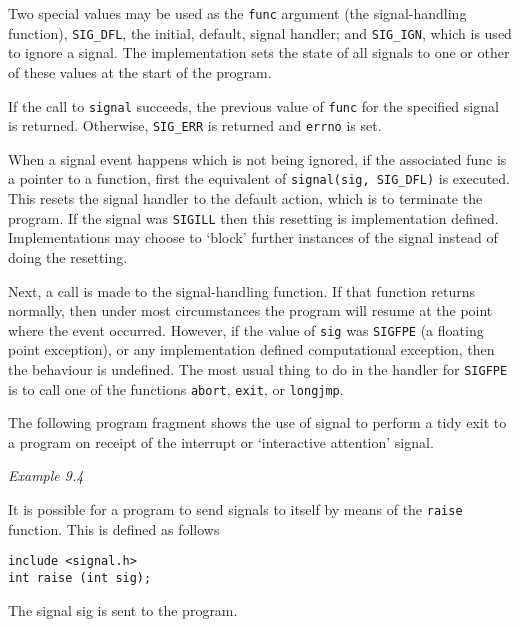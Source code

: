   Two special values may be used as  the  \texttt{func}  argument  (the
   signal-handling  function),  \texttt{SIG\_DFL},  the initial, default,
   signal handler; and \texttt{SIG\_IGN},  which  is  used  to  ignore
   a signal.  The implementation sets the state of all signals to one or other
   of these values at the start of the program.


  If the call to \texttt{signal} succeeds, the previous value  of
   \texttt{func} for the specified signal is returned.  Otherwise,
   \texttt{SIG\_ERR} is returned and \texttt{errno} is set.


  When a signal event happens which is not being  ignored,  if the
   associated  func  is a pointer to a function, first the equivalent of
   \texttt{signal(sig, SIG\_DFL)} is executed. This  resets the  signal
   handler  to  the  default  action,  which is to terminate the program.  If
   the signal was \texttt{SIGILL}  then  this resetting  is  implementation
   defined.  Implementations may choose to `block' further instances of
   the signal instead of doing the resetting.


  Next, a call is made to the  signal-handling  function.   If that
   function   returns   normally,   then   under   most circumstances the
   program will resume at the point where the event  occurred.  However, if the
   value of \texttt{sig} was \texttt{SIGFPE} (a floating point
   exception),  or  any  implementation  defined computational  exception,
   then  the behaviour is undefined.  The most usual thing to do in the handler
   for \texttt{SIGFPE}  is  to call one of the functions
   \texttt{abort}, \texttt{exit}, or \texttt{longjmp}.


  The following program fragment shows the use  of  signal  to perform
   a tidy exit to a program on receipt of the interrupt or `interactive
   attention' signal.


  \begin{center}\textit{Example 9.4}\end{center}


  It is possible for a program to send signals  to  itself  by means of the
   \texttt{raise} function. This is defined as follows


  \begin{Verbatim}
include <signal.h>
int raise (int sig);
\end{Verbatim}

  The signal sig is sent to the program.


